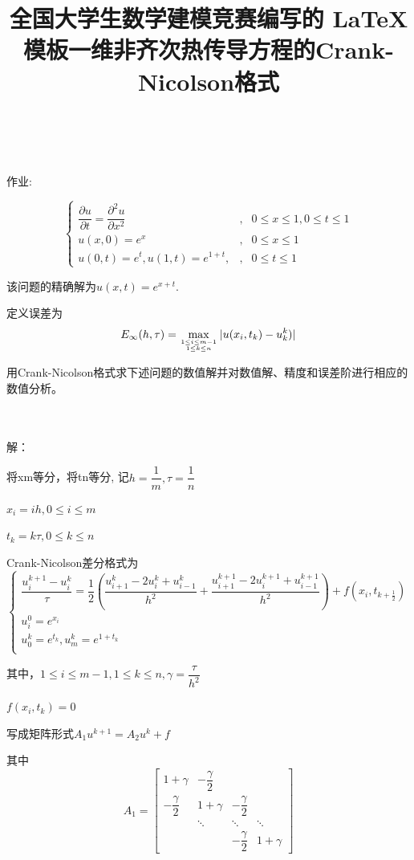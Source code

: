\documentclass[withoutpreface,bwprint]{cumcmthesis} %
\title{全国大学生数学建模竞赛编写的 \LaTeX{} 模板}
\title{一维非齐次热传导方程的Crank-Nicolson格式}
\begin{document}
	\maketitle
	~\\
	~\\
	
	作业:
	
	$$
	\left\{
	\begin{array}{lcl}
	\dfrac{\partial{u}}{\partial{t}}=\dfrac{\partial^{2}{u}}{\partial{x}^{2}} &,&0 \leq x \leq 1,0 \leq t \leq 1 \\
	
	u(x,0)=e^x &, & 0 \leq x \leq 1 \\
	
	u(0,t)=e^t,u(1,t)=e^{1+t},&, &0 \leq t \leq 1
	\end{array}
	\right.
	$$

该问题的精确解为$ u(x,t)=e^{x+t}$.

定义误差为$$ E_{\infty}(h,\tau)=\max \limits_{1 \leq i \leq m-1 \atop 1 \leq k \leq n } |u(x_{i},t_{k})-u_{k}^k)| $$

用Crank-Nicolson格式求下述问题的数值解并对数值解、精度和误差阶进行相应的数值分析。


~\\
~\\

解：

将xm等分，将tn等分, 记$h=\dfrac{1}{m},\tau=\dfrac{1}{n}$

$x_i=ih,0 \leq i \leq m$

$t_k=k \tau,0 \leq k \leq n$

Crank-Nicolson差分格式为
\begin{equation*}
\left\{
\begin{array}{lcl}
\dfrac{u_i^{k+1}-u_i^{k}}{\tau}=\dfrac{1}{2}(\dfrac{u_{i+1}^k-2u_{i}^{k}+u_{i-1}^k}{h^2}+\dfrac{u_{i+1}^{k+1}-2u_{i}^{k+1}+u_{i-1}^{k+1}}{h^2})+f(x_i,t_{k+\frac{1}{2}}) \\
u_i^0=e^{x_{i}} \\
u_0^k=e^{t_k},u_m^k=e^{1+t_k} \\
\end{array}
\right.
\end{equation*}

其中，$1 \leq i \leq m-1,1 \leq k \leq n,\gamma=\dfrac{\tau}{h^2}$

$f(x_i,t_k)=0$



写成矩阵形式$A_1u^{k+1}=A_2u^k+f$

其中
$$
A_1=
\begin{bmatrix}
1+\gamma & -\dfrac{\gamma}{2} \\
-\dfrac{\gamma}{2} & 1+\gamma & -\dfrac{\gamma}{2} \\
& \ddots & \ddots & \ddots \\
& & 	-\dfrac{\gamma}{2} & 1+\gamma
\end{bmatrix}
$$
\end{document}
